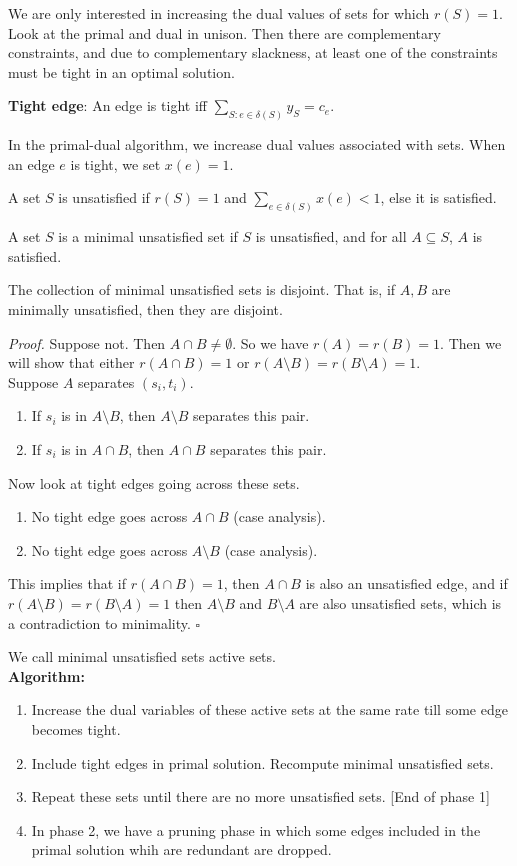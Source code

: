 \documentclass[a4paper]{article}
\newenvironment{proof}{\begin{breakbox}\textit{Proof.}}{\hfill$\square$\end{breakbox}}
\newcommand{\nl}{\vspace{0.2cm}\\}
\begin{document}
We are only interested in increasing the dual values of sets for which $r(S) = 1$.\nl
Look at the primal and dual in unison. Then there are complementary constraints, and due to complementary slackness, at least one of the constraints must be tight in an optimal solution.\nl
\begin{defn}
    \textbf{Tight edge}: An edge is tight iff $\sum_{S : e \in \delta(S)} y_S = c_e$.
\end{defn}
In the primal-dual algorithm, we increase dual values associated with sets. When an edge $e$ is tight, we set $x(e) = 1$.\nl
\begin{defn}
    A set $S$ is unsatisfied if $r(S) = 1$ and $\sum_{e \in \delta(S)} x(e) < 1$, else it is satisfied.
\end{defn}
\begin{defn}
    A set $S$ is a minimal unsatisfied set if $S$ is unsatisfied, and for all $A \subseteq S$, $A$ is satisfied.
\end{defn}
\begin{claim}
    The collection of minimal unsatisfied sets is disjoint. That is, if $A, B$ are minimally unsatisfied, then they are disjoint.
\end{claim}
\begin{proof}
    Suppose not. Then $A \cap B \ne \emptyset$. So we have $r(A) = r(B) = 1$. Then we will show that either $r(A \cap B) = 1$ or $r(A \setminus B) = r(B \setminus A) = 1$.\nl
    Suppose $A$ separates $(s_i, t_i)$.
    \begin{enumerate}
        \item If $s_i$ is in $A \setminus B$, then $A \setminus B$ separates this pair.
        \item If $s_i$ is in $A \cap B$, then $A \cap B$ separates this pair.
    \end{enumerate}
    Now look at tight edges going across these sets.
    \begin{enumerate}
        \item No tight edge goes across $A \cap B$ (case analysis).
        \item No tight edge goes across $A \setminus B$ (case analysis).
    \end{enumerate}
    This implies that if $r(A \cap B) = 1$, then $A \cap B$ is also an unsatisfied edge, and if $r(A \setminus B) = r(B \setminus A) = 1$ then $A \setminus B$ and $B \setminus A$ are also
    unsatisfied sets, which is a contradiction to minimality.
\end{proof}
We call minimal unsatisfied sets active sets.\nl
\textbf{Algorithm:}
\begin{enumerate}
    \item Increase the dual variables of these active sets at the same rate till some edge becomes tight.
    \item Include tight edges in primal solution. Recompute minimal unsatisfied sets.
    \item Repeat these sets until there are no more unsatisfied sets. [End of phase 1]
    \item In phase 2, we have a pruning phase in which some edges included in the primal solution whih are redundant are dropped.
\end{enumerate}
\end{document}

